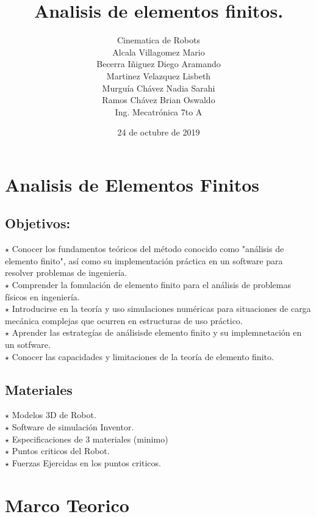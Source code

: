 \documentclass[letter,openright,12pt,spanish]{report}
\title{\textbf{Analisis de elementos finitos.}}
\author{Cinematica de Robots\\
		Alcala Villagomez Mario\\
		Becerra Iñiguez Diego Aramando\\
		Martinez Velazquez Lisbeth\\
		Murgu\'ia Ch\'avez Nadia Sarahi\\
		Ramos Ch\'avez Brian Oswaldo\\
		Ing. Mecatr\'onica 7to A}
\date{24 de octubre de 2019}
\begin{document}
\maketitle

\section{Analisis de Elementos Finitos}

\subsection{Objetivos:}

$\star$ Conocer los fundamentos te\'oricos del m\'etodo conocido como "an\'alisis de elemento finito", as\'i como su implementaci\'on pr\'actica en un software para resolver problemas de ingenier\'ia.\\
$\star$ Comprender la fomulaci\'on de elemento finito para el an\'alisis de problemas f\'isicos en ingenier\'ia.\\
$\star$ Introducirse en la teor\'ia y uso simulaciones num\'ericas para situaciones de carga mec\'anica complejas que ocurren en estructuras de uso pr\'actico.\\
$\star$ Aprender las estrateg\'ias de an\'alisisde elemento finito y su implemnetaci\'on en un sotfware.\\
$\star$ Conocer las capacidades y limitaciones de la teor\'ia de elemento finito.

\subsection{Materiales}

$\star$ Modelos 3D  de Robot.\\
$\star$ Software de simulaci\'on Inventor.\\
$\star$ Especificaciones de 3 materiales (minimo)\\
$\star$ Puntos criticos del Robot.\\
$\star$ Fuerzas Ejercidas en los puntos criticos.

\section{Marco Teorico}
\end{document}
